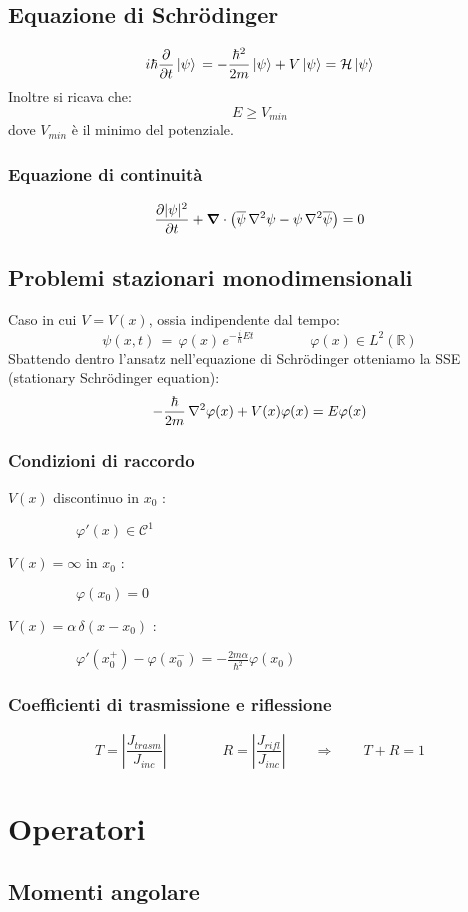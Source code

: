 \subsection{Equazione di Schr\"{o}dinger}
$$ 
  i\hbar \frac{ \partial }{ \partial t}\left| \psi \right> \, = -\frac{\hbar^2}{2m}\left| \psi \right> + V \left| \psi \right>  = \mathcal{H} \left| \psi \right>
$$
Inoltre si ricava che:
$$
E \geq V_{min}
$$
dove $V_{min}$ è il minimo del potenziale.
\subsubsection{Equazione di continuità}
$$
\frac{\partial | \psi|^2}{\partial t} + \mbox{\boldmath$ \nabla $} \cdot \left( \overline{\psi} \, \nabla^2\psi - \psi \, \nabla^2\overline{\psi} \right) = 0
$$
\subsection{Problemi stazionari monodimensionali}
Caso in cui $ V= V(x)$, ossia indipendente dal tempo:
$$	\psi(x,t) \, = \, \varphi(x) \, e^{ -\frac{i}{\hbar} E t } \qquad \qquad \varphi(x) \in L^2(\mathbb{R}) 
$$	 
Sbattendo dentro l'ansatz nell'equazione di Schr\"{o}dinger otteniamo la SSE (stationary Schr\"{o}dinger equation):
$$
-\frac{\hbar}{2m} \, \nabla^2 \varphi(x) + V(x) \varphi(x) = E \varphi(x)
$$ 
\subsubsection{Condizioni di raccordo}
\begin{description}
 \item[$V(x)$ discontinuo in $x_0$ : ] $\qquad \varphi ' (x) \in \mathcal{C}^1 $
  \item[$V(x) = \infty$ in $x_0$ : ] $	\qquad \varphi(x_0) = 0 $
 \item[$V(x) = \alpha \, \delta (x-x_0)$ : ] $\qquad \varphi'(x_{0}^{+}) - \varphi(x_{0}^{-}) = -\frac{2 m \alpha}{\hbar^2} \varphi(x_0)$
\end{description}
\subsubsection{Coefficienti di trasmissione e riflessione}
$$
T = \left| \frac{J_{trasm}}{J_{inc}}\right|  \qquad \qquad R = \left| \frac{J_{rifl}}{J_{inc}} \right| \qquad \Longrightarrow \qquad T + R = 1 
$$ 


\section{Operatori}
\subsection{Momenti angolare}

